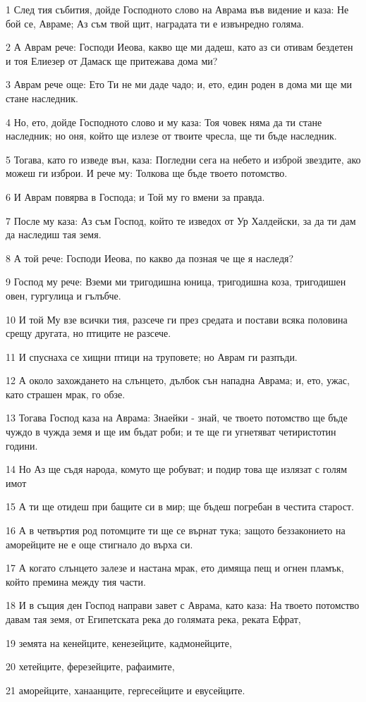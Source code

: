 \par 1 След тия събития, дойде Господното слово на Аврама във видение и каза: Не бой се, Авраме; Аз съм твой щит, наградата ти е извънредно голяма.
\par 2 А Аврам рече: Господи Иеова, какво ще ми дадеш, като аз си отивам бездетен и тоя Елиезер от Дамаск ще притежава дома ми?
\par 3 Аврам рече още: Ето Ти не ми даде чадо; и, ето, един роден в дома ми ще ми стане наследник.
\par 4 Но, ето, дойде Господното слово и му каза: Тоя човек няма да ти стане наследник; но оня, който ще излезе от твоите чресла, ще ти бъде наследник.
\par 5 Тогава, като го изведе вън, каза: Погледни сега на небето и изброй звездите, ако можеш ги изброи. И рече му: Толкова ще бъде твоето потомство.
\par 6 И Аврам повярва в Господа; и Той му го вмени за правда.
\par 7 После му каза: Аз съм Господ, който те изведох от Ур Халдейски, за да ти дам да наследиш тая земя.
\par 8 А той рече: Господи Иеова, по какво да позная че ще я наследя?
\par 9 Господ му рече: Вземи ми тригодишна юница, тригодишна коза, тригодишен овен, гургулица и гълъбче.
\par 10 И той Му взе всички тия, разсече ги през средата и постави всяка половина срещу другата, но птиците не разсече.
\par 11 И спуснаха се хищни птици на труповете; но Аврам ги разпъди.
\par 12 А около захождането на слънцето, дълбок сън нападна Аврама; и, ето, ужас, като страшен мрак, го обзе.
\par 13 Тогава Господ каза на Аврама: Знаейки - знай, че твоето потомство ще бъде чуждо в чужда земя и ще им бъдат роби; и те ще ги угнетяват четиристотин години.
\par 14 Но Аз ще съдя народа, комуто ще робуват; и подир това ще излязат с голям имот
\par 15 А ти ще отидеш при бащите си в мир; ще бъдеш погребан в честита старост.
\par 16 А в четвъртия род потомците ти ще се върнат тука; защото беззаконието на аморейците не е още стигнало до върха си.
\par 17 А когато слънцето залезе и настана мрак, ето димяща пещ и огнен пламък, който премина между тия части.
\par 18 И в същия ден Господ направи завет с Аврама, като каза: На твоето потомство давам тая земя, от Египетската река до голямата река, реката Ефрат,
\par 19 земята на кенейците, кенезейците, кадмонейците,
\par 20 хетейците, ферезейците, рафаимите,
\par 21 аморейците, ханаанците, гергесейците и евусейците.

